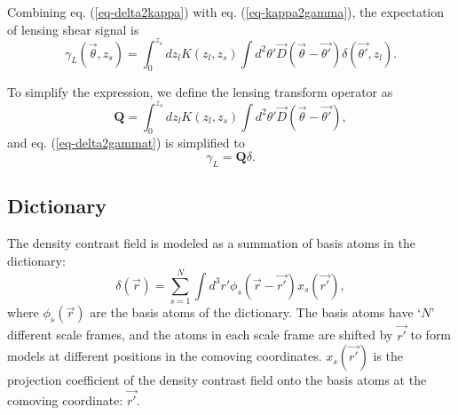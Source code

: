 \documentclass[twocolumn]{aastex63}
\begin{document}
Combining eq. (\ref{eq-delta2kappa}) with eq. (\ref{eq-kappa2gamma}),
the expectation of lensing shear signal is
\begin{equation}\label{eq-delta2gammat}
\gamma_L(\vec{\theta},z_s) = \int_0^{z_s} dz_l K(z_l,z_s) \int d^2 \theta' \vec{D}(\vec{\theta}-\vec{\theta'}) \delta(\vec{\theta'},z_l).
\end{equation}

To simplify the expression, we define the lensing transform operator as
\begin{equation}
\mathbf{Q}=\int_0^{z_s} dz_l K(z_l,z_s) \int d^2 \theta'  \vec{D}(\vec{\theta}-\vec{\theta'}),
\end{equation}
and eq. (\ref{eq-delta2gammat}) is simplified to
\begin{equation} \label{eq-delta2gammat-simp}
\gamma_L=\mathbf{Q}\delta.
\end{equation}

\subsection{Dictionary}
\label{subsec_method_dictionary}

The density contrast field is modeled as a summation of basis atoms in the
dictionary:
\begin{equation}\label{eq-x2delta}
\delta(\vec{r}) = \sum_{s=1}^{N} \int d^3 r' \phi_s(\vec{r}-\vec{r'}) x_s(\vec{r'}),
\end{equation}
where $\phi_s(\vec{r})$ are the basis atoms of the dictionary. The basis atoms
have `$N$' different scale frames, and the atoms in each scale frame are
shifted by $\vec{r'}$ to form models at different positions in the comoving
coordinates.  $x_s(\vec{r'})$ is the projection coefficient of the density
contrast field onto the basis atoms at the comoving coordinate: $\vec{r'}$.
\end{document}
